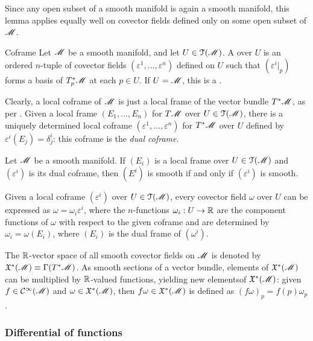 Since any open subset of a smooth manifold is again a smooth manifold, this lemma applies equally well on covector fields defined only on some open subset of $ \mathscr{M} $.

\begin{definition}{Coframe}{}
  Let $ \mathscr{M} $ be a smooth manifold, and let $ U \in \EuScript{T}(\mathscr{M}) $. A  over $ U $ is an ordered $ n $-tuple of covector fields $ (\varepsilon^1 , \dots , \varepsilon^n) $ defined on $ U $ such that $ (\varepsilon^i \vert_p) $ forms a basis of $ T^*_p\mathscr{M} $ at each $ p \in U $. If $ U = \mathscr{M} $, this is a .
\end{definition}

Clearly, a local coframe of $ \mathscr{M} $ is just a local frame of the vector bundle $ T^*\mathscr{M} $, as per . Given a local frame $ (E_1 , \dots , E_n) $ for $ T\mathscr{M} $ over $ U \in \EuScript{T}(\mathscr{M}) $, there is a uniquely determined local coframe $ (\varepsilon^1 , \dots , \varepsilon^n) $ for $ T^*\mathscr{M} $ over $ U $ defined by $ \varepsilon^i(E_j) = \delta^i_j $: this coframe is the \emph{dual coframe}.

\begin{lemma}{}{}
  Let $ \mathscr{M} $ be a smooth manifold. If $ (E_i) $ is a local frame over $ U \in \EuScript{T}(\mathscr{M}) $ and $ (\varepsilon^i) $ is its dual coframe, then $ (E^i) $ is smooth if and only if $ (\varepsilon^i) $ is smooth.
\end{lemma}

Given a local coframe $ (\varepsilon^i) $ over $ U \in \EuScript{T}(\mathscr{M}) $, every covector field $ \omega $ over $ U $ can be expressed as $ \omega = \omega_i \varepsilon^i $, where the $ n $-functions $ \omega_i : U \rightarrow \mathbb{R} $ are the component functions of $ \omega $ with respect to the given coframe and are determined by $ \omega_i = \omega(E_i) $, where $ (E_i) $ is the dual frame of $ (\omega^i) $.

The $ \mathbb{R} $-vector space of all smooth covector fields on $ \mathscr{M} $ is denoted by $ \mathfrak{X}^*(\mathscr{M}) \equiv \Gamma(T^*\mathscr{M}) $. As smooth sections of a vector bundle, elements of $ \mathfrak{X}^*(\mathscr{M}) $ can be multiplied by $ \mathbb{R} $-valued functions, yielding new elements\footnotemark of $ \mathfrak{X}^*(\mathscr{M}) $: given $ f \in \mathcal{C}^{\infty}(\mathscr{M}) $ and $ \omega \in \mathfrak{X}^*(\mathscr{M}) $, then $ f\omega \in \mathfrak{X}^*(\mathscr{M}) $ is defined as $ (f\omega)_p = f(p) \omega_p $.


\subsubsection{Differential of functions}

